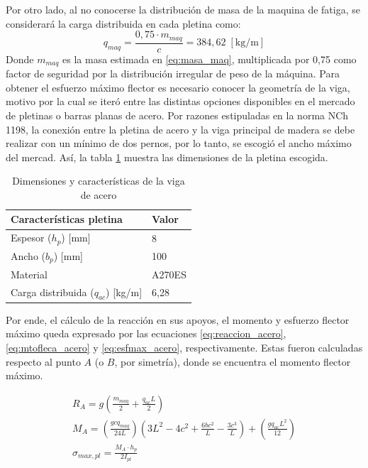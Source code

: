 Por otro lado, al no conocerse la distribución de masa de la maquina de fatiga, se considerará la carga distribuida en cada pletina como:
\begin{equation}
	 q_{maq} = \frac{0,75\cdot m_{maq}}{c} = 384,62 \; [\text{kg/m}]
\end{equation}
Donde $m_{maq}$ es la masa estimada en \ref{eq:masa_maq}, multiplicada por 0,75 como factor de seguridad por la distribución irregular de peso de la máquina. Para obtener el esfuerzo máximo flector es necesario conocer la geometría de la viga, motivo por la cual se iteró entre las distintas opciones disponibles en el mercado de pletinas o barras planas de acero. Por razones estipuladas en la norma NCh 1198, la conexión entre la pletina de acero y la viga principal de madera se debe realizar con un mínimo de dos pernos, por lo tanto, se escogió el ancho máximo del mercad. Así, la tabla \ref{tab:dimycar_pletina} muestra las dimensiones de la pletina escogida.
\begin{table}[h]
\centering
\begin{tabular}{@{}ll@{}}
\toprule
Características pletina			       			& Valor        \\ \midrule
Espesor ($h_p$) {[}mm{]}              			& 8            \\
Ancho ($b_p$) {[}mm{]}               		    & 100          \\
Material    		                		    & A270ES	   \\
Carga distribuida ($q_{ac}$) {[}kg/m{]}		    & 6,28         \\ \bottomrule
\end{tabular}
\caption{Dimensiones y características de la viga de acero}
\label{tab:dimycar_pletina}
\end{table}

Por ende, el cálculo de la reacción en sus apoyos, el momento y esfuerzo flector máximo queda expresado por las ecuaciones \ref{eq:reaccion_acero}, \ref{eq:mtofleca_acero} y \ref{eq:esfmax_acero}, respectivamente. Estas fueron calculadas respecto al punto $A$ (o $B$, por simetría), donde se encuentra el momento flector máximo.

\begin{subequations}
	\begin{gather}
		R_A = g\left(\frac{m_{maq}}{2} + \frac{q_{ac}L}{2}\right) \label{eq:reaccion_acero}\\ 
		M_A = \left(\frac{gcq_{maq}}{24L}\right) \left(3L^2 - 4c^2 + \frac{6bc^2}{L} - \frac{3c^3}{L}\right) + \left(\frac{gq_{ac}L^2}{12}\right) \label{eq:mtofleca_acero} \\
		\sigma_{max,pl} = \frac{M_A \cdot h_p}{2I_{pl}} \label{eq:esfmax_acero}
	\end{gather}
\end{subequations}

